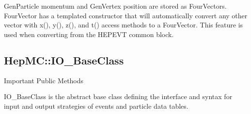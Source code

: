\documentclass[11pt,letterpaper]{article}
\begin{document}
GenParticle momentum and GenVertex position are stored as FourVectors.
FourVector has a templated constructor that will automatically convert 
any other vector with x(), y(), z(), and t() access methods to a FourVector.
This feature is used when converting from the HEPEVT common block.

%
%

\subsection{HepMC::IO\_BaseClass}
\begin{myitemize}{Important Public Methods}
\end{myitemize}

IO\_BaseClass is the abstract base class defining the interface and
syntax for input and output strategies of events and particle data tables.
\end{document}
